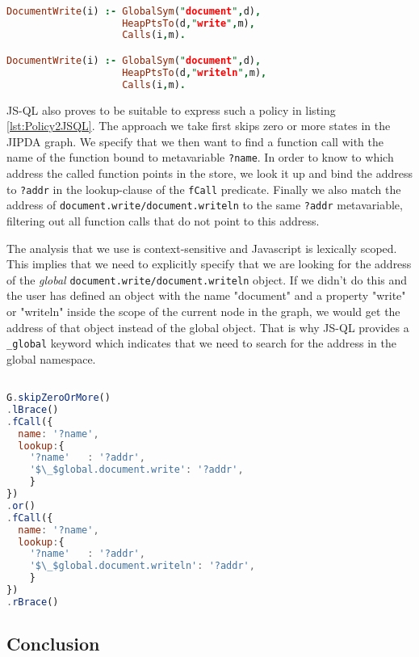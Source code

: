 \begin{lstlisting}[label={lst:Policy2GK},language=Prolog,caption=Policy 2 in GateKeeper,mathescape=true]  % float=t?

DocumentWrite(i) :- GlobalSym("document",d),
                    HeapPtsTo(d,"write",m),
                    Calls(i,m).

DocumentWrite(i) :- GlobalSym("document",d),
                    HeapPtsTo(d,"writeln",m),
                    Calls(i,m).
\end{lstlisting}

JS-QL also proves to be suitable to express such a policy in listing \ref{lst:Policy2JSQL}. The approach we take first skips zero or more states in the JIPDA graph. We specify that we then want to find a function call with the name of the function bound to metavariable \texttt{?name}. In order to know to which address the called function points in the store, we look it up and bind the address to \texttt{?addr} in the lookup-clause of the \texttt{fCall} predicate. Finally we also match the address of \texttt{document.write/document.writeln} to the same \texttt{?addr} metavariable, filtering out all function calls that do not point to this address.

The analysis that we use is context-sensitive and Javascript is lexically scoped. This implies that we need to explicitly specify that we are looking for the address of the \textit{global} \texttt{document.write/document.writeln} object. If we didn't do this and the user has defined an object with the name "document" and a property "write" or "writeln" inside the scope of the current node in the graph, we would get the address of that object instead of the global object. That is why JS-QL provides a \texttt{\_global} keyword which indicates that we need to search for the address in the global namespace. 

\begin{lstlisting}[label={lst:Policy2JSQL},language=JavaScript,caption=Policy 2 in JS-QL,mathescape=true]  % float=t?

G.skipZeroOrMore()
.lBrace()
.fCall({
  name: '?name',
  lookup:{
    '?name'   : '?addr',
    '$\_$global.document.write': '?addr',
    }
})
.or()
.fCall({
  name: '?name',
  lookup:{
    '?name'   : '?addr',
    '$\_$global.document.writeln': '?addr',
    }
})
.rBrace()
\end{lstlisting}


\subsection{Conclusion}


